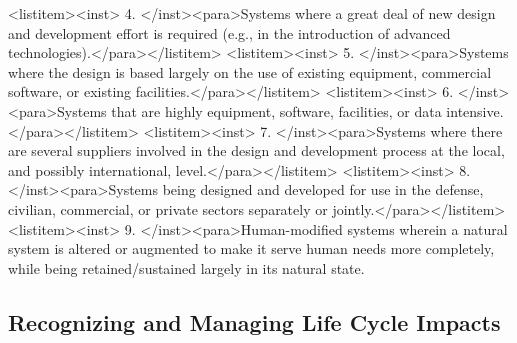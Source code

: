 <listitem><inst>	4.	</inst><para>Systems where a great deal of new design and development effort is required (e.g., in the introduction of advanced technologies).</para></listitem>
<listitem><inst>	5.	</inst><para>Systems where the design is based largely on the use of existing equipment, commercial software, or existing facilities.</para></listitem>
<listitem><inst>	6.	</inst><para>Systems that are highly equipment, software, facilities, or data intensive.</para></listitem>
<listitem><inst>	7.	</inst><para>Systems where there are several suppliers involved in the design and development process at the local, and possibly international, level.</para></listitem>
<listitem><inst>	8.	</inst><para>Systems being designed and developed for use in the defense, civilian, commercial, or private sectors separately or jointly.</para></listitem>
<listitem><inst>	9.	</inst><para>Human-modified systems wherein a natural system is altered or augmented to make it serve human needs more completely, while being retained/sustained largely in its natural state.

\subsection{Recognizing and Managing Life Cycle Impacts}

